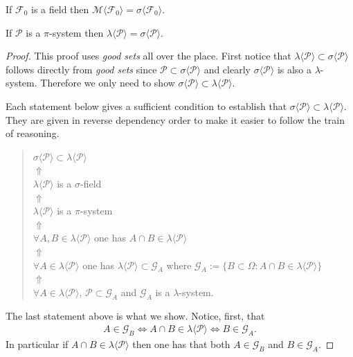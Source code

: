 \begin{theorem}  If $\mathcal F_0$ is a field then $\mathscr M\langle \mathcal F_0\rangle = \sigma\langle \mathcal F_0\rangle$.
\end{theorem}


\begin{theorem}  If $\mathcal P$ is a $\pi$-system then $\mathcal \lambda\langle \mathcal P\rangle = \sigma\langle \mathcal P\rangle$.
\end{theorem}
\begin{proof} This proof uses {\it good sets} all over the place.
First notice that  $\lambda\langle \mathcal P\rangle \subset \sigma\langle \mathcal P\rangle$ follows directly from {\it good sets} since $\mathcal P \subset \sigma\langle \mathcal P\rangle$ and clearly $ \sigma\langle \mathcal P\rangle$ is also a $\lambda$-system. Therefore we only need to show $\sigma\langle \mathcal P\rangle \subset \lambda\langle \mathcal P\rangle$.

Each statement below gives a sufficient condition to establish that $\sigma\langle \mathcal P\rangle \subset \lambda\langle \mathcal P\rangle$. They are given in reverse dependency order to make it easier to follow the train of reasoning.

\begin{quote}
\begin{centering}
$\sigma\langle \mathcal P\rangle \subset \lambda\langle \mathcal P\rangle$
 \\
$\Uparrow$
\\
$\lambda\langle\mathcal P\rangle$ is a $\sigma$-field
 \\
$\Uparrow$
\\
$\lambda\langle\mathcal P\rangle$ is a $\pi$-system
 \\
$\Uparrow$
\\
$\forall A, B\in \lambda\langle\mathcal P\rangle$ one has $ A\cap B\in \lambda\langle\mathcal P\rangle$
 \\
$\Uparrow$
\\
$\forall A \in \lambda\langle\mathcal P\rangle$ one has $\lambda \langle \mathcal P\rangle \subset \mathcal G_A$ where $\mathcal G_A:=\bigl\{ B\subset \Omega\colon A\cap B\in \lambda\langle \mathcal P\rangle \bigr\} $
\\
$\Uparrow$
\\
$\forall A \in \lambda\langle\mathcal P\rangle$, $\mathcal P\subset \mathcal G_A$ and $\mathcal G_A$ is a $\lambda$-system. \\
\end{centering}
\end{quote}
The last statement above is what we show. Notice, first, that
\begin{align}
\label{eq: l+d good set}
A\in \mathcal G_B \Longleftrightarrow A\cap B\in \lambda\langle \mathcal P\rangle \Longleftrightarrow B\in \mathcal G_A.
\end{align}
In particular if $A\cap B\in \lambda\langle\mathcal P\rangle$ then one has that both $A\in \mathcal G_B$ and $B\in \mathcal G_A$.



\end{proof}
